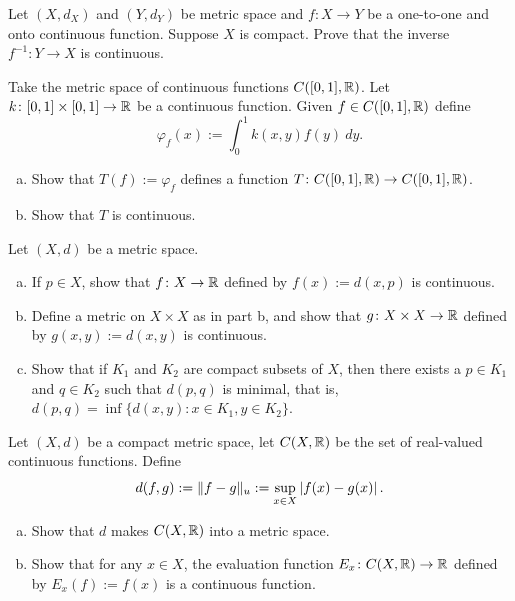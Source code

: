 \begin{exercise}
Let $(X,d_X)$ and $(Y,d_Y)$ be metric space and
$f \colon X \to Y$ be a one-to-one and onto continuous function.  Suppose
$X$ is compact.  Prove that the inverse $f^{-1} \colon Y \to X$
is continuous.
\end{exercise}

\begin{exercise}
Take the metric space of continuous functions $C([0,1],{\mathbb{R}})$.  Let
$k \colon [0,1] \times [0,1] \to {\mathbb{R}}$ be a continuous function.
Given $f \in C([0,1],{\mathbb{R}})$ define
\begin{equation*}
\varphi_f(x) := \int_0^1 k(x,y) f(y) ~dy .
\end{equation*}
\begin{enumerate}[a)]
\item
Show that $T(f) := \varphi_f$ defines a function $T \colon C([0,1],{\mathbb{R}}) \to
C([0,1],{\mathbb{R}})$.
\item
Show that $T$ is continuous.
\end{enumerate}
\end{exercise}

\begin{samepage}
\begin{exercise}
Let $(X,d)$ be a metric space.
\begin{enumerate}[a)]
\item
If $p \in X$,
show that $f \colon X \to {\mathbb{R}}$ defined
by $f(x) := d(x,p)$ is continuous.
\item
Define a metric on $X \times X$ as in  part
b, and show that $g \colon X \times X \to {\mathbb{R}}$ defined by
$g(x,y) := d(x,y)$ is continuous.
\item
Show that if $K_1$ and $K_2$ are compact subsets of $X$, then
there exists a $p \in K_1$ and $q \in K_2$ such that $d(p,q)$ is minimal,
that is, $d(p,q) = \inf \{ d(x,y) \colon x \in K_1, y \in K_2 \}$.
\end{enumerate}
\end{exercise}
\end{samepage}

\begin{exercise}
Let $(X,d)$ be a compact metric space, let $C(X,{\mathbb{R}})$ be the set
of real-valued continuous functions.  Define
\begin{equation*}
d(f,g) := \lVert {f-g} \rVert_u := \sup_{x \in X} \left\lvert {f(x)-g(x)} \right\rvert .
\end{equation*}
\begin{enumerate}[a)]
\item
Show that $d$ makes $C(X,{\mathbb{R}})$ into a metric space.
\item
Show that for any $x \in X$, the evaluation function
$E_x \colon C(X,{\mathbb{R}}) \to {\mathbb{R}}$ defined by $E_x(f) := f(x)$
is a continuous function.
\end{enumerate}
\end{exercise}

